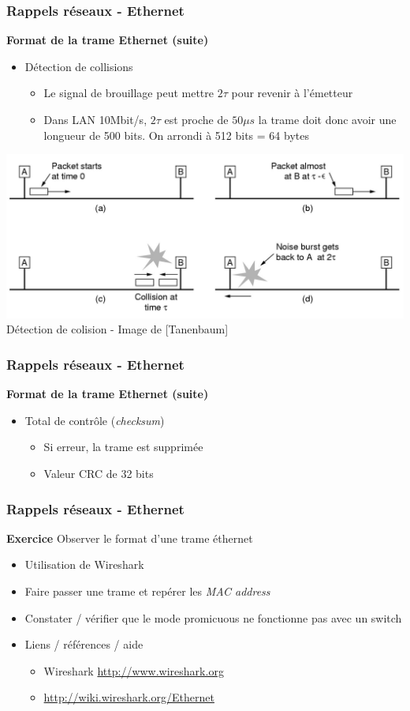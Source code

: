 \begin{frame}[fragile]
  \frametitle{Rappels réseaux - Ethernet}
{\large\bf Format de la trame Ethernet (suite)}
\begin{itemize}
	\item Détection de collisions
	\begin{itemize}
		\item Le signal de brouillage peut mettre $2\tau$ pour revenir à l'émetteur 
		\item Dans LAN 10Mbit/s, $2\tau$ est proche de $50\mu s$  la trame
		doit donc avoir une longueur de 500 bits. On arrondi à 512 bits = 64
		bytes
	\end{itemize}
\end{itemize}
\begin{center}
	\includegraphics[width=.80\linewidth]{img/4-22.jpg} \\
	{\scriptsize Détection de colision - Image de [Tanenbaum]}
\end{center}
\end{frame}

\begin{frame}[fragile]
  \frametitle{Rappels réseaux - Ethernet}
{\large\bf Format de la trame Ethernet (suite)}
\begin{itemize}
	\item Total de contrôle (\textit{checksum})
	\begin{itemize}
		\item Si erreur, la trame est supprimée
		\item Valeur CRC de 32 bits
	\end{itemize}
\end{itemize}
\end{frame}


\begin{frame}[fragile]
  \frametitle{Rappels réseaux - Ethernet}
{\large\bf Exercice}
Observer le format d'une trame éthernet 
\begin{itemize}
	\item Utilisation de Wireshark
	\item Faire passer une trame et repérer les \textit{MAC address}
	\item Constater / vérifier que le mode promicuous ne fonctionne pas avec un switch
	\item Liens / références / aide
	\begin{itemize}
		\item Wireshark \url{http://www.wireshark.org}
		\item\url{http://wiki.wireshark.org/Ethernet}
	\end{itemize}
\end{itemize}
\end{frame}


